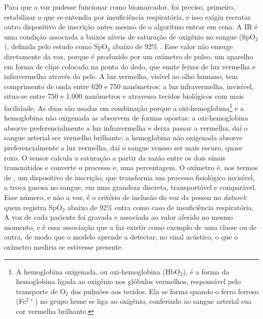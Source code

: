 Para que a voz pudesse funcionar como biomarcador, foi preciso, primeiro, estabilizar o que se entendia por insuficiência respiratória, e isso exigiu recrutar outro dispositivo de inscrição antes mesmo de o algoritmo entrar em cena. A IR é uma condição associada a baixos níveis de saturação de oxigênio no sangue (SpO$_2$), definida pelo estudo como SpO$_2$ abaixo de 92\% \parencite{Gauy2024Discriminant}. Esse valor não emerge diretamente da voz, porque é produzido por um oxímetro de pulso, um aparelho em forma de clipe colocado na ponta do dedo, que emite feixes de luz vermelha e infravermelha através da pele. A luz vermelha, visível ao olho humano, tem comprimento de onda entre 620 e 750 nanômetros; a luz infravermelha, invisível, situa-se entre 750 e 1.000 nanômetros e atravessa tecidos biológicos com mais facilidade. As duas são usadas em combinação porque a oxi-hemoglobina\footnote{A hemoglobina oxigenada, ou oxi-hemoglobina (HbO$_2$), é a forma da hemoglobina ligada ao oxigênio nos glóbulos vermelhos, responsável pelo transporte de O$_2$ dos pulmões aos tecidos. Ela se forma quando o ferro ferroso (Fe$^{2+}$) no grupo heme se liga ao oxigênio, conferindo ao sangue arterial sua cor vermelha brilhante.} e a hemoglobina não oxigenada as absorvem de formas opostas: a oxi-hemoglobina absorve preferencialmente a luz infravermelha e deixa passar a vermelha, daí o sangue arterial ser vermelho brilhante; a hemoglobina não oxigenada absorve preferencialmente a luz vermelha, daí o sangue venoso ser mais escuro, quase roxo. O sensor calcula a saturação a partir da razão entre os dois sinais transmitidos e converte o processo e, uma percentagem. O oxímetro é, nos termos de \textcite{Latour1986Visualization}, um dispositivo de inscrição, que transforma um processo fisiológico invisível, a troca gasosa no sangue, em uma grandeza discreta, transportável e comparável. Esse número, e não a voz, é o critério de inclusão do voz da pessoa no \textit{dataset}: quem registra SpO$_2$ abaixo de 92\% entra como caso de insuficiência respiratória. A voz de cada paciente foi gravada e associada ao valor aferido no mesmo momento, e é essa associação que a faz existir como exemplo de uma classe ou de outra, de modo que o modelo aprende a detectar, no sinal acústico, o que o oxímetro mediria se estivesse presente.

